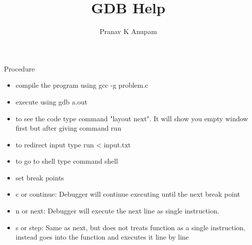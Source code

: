 \documentclass[12pt,a4paper]{article}
\title{GDB Help}
\author{Pranav K Anupam}
\begin{document}
\maketitle
Procedure 
\begin{itemize}
\item compile the program using gcc -g problem.c
\item execute using gdb a.out 
\item to see the code type command "layout next". It will show you empty window first but after giving command run 
\item to redirect input type run < input.txt
\item to go to shell type command shell
\item set break points 
\item c or continue: Debugger will continue executing until the next break point
\item n or next: Debugger will execute the next line as single instruction. 
\item s or step: Same as next, but does not treats function as a single instruction, instead goes into the function and executes it line by line 
\end{itemize}
\end{document}
